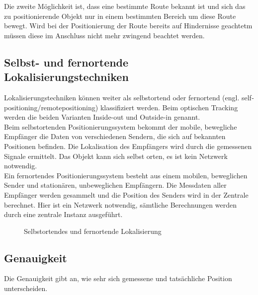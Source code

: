    Die zweite Möglichkeit ist, dass eine bestimmte Route bekannt ist und sich das zu positionierende Objekt nur in einem bestimmten Bereich um diese Route bewegt.
    Wird bei der Positionierung der Route bereits auf Hindernisse geachtetm müssen diese im Anschluss nicht mehr zwingend beachtet werden.

    \subsection*{Selbst- und fernortende Lokalisierungstechniken}
    Lokalisierungstechniken können weiter als selbstortend oder fernortend (engl. self­positioning/remote­positioning) klassifiziert werden. Beim optischen Tracking werden die beiden Varianten Inside-out und Outside-in genannt.\\
    Beim selbstortenden Positionierungssystem bekommt der mobile, bewegliche Empfänger die Daten von verschiedenen Sendern, die sich auf bekannten Positionen befinden. Die Lokalisation des Empfängers wird durch die gemessenen Signale ermittelt. Das Objekt kann sich selbst orten, es ist kein Netzwerk notwendig.\\
    Ein fernortendes Positionierungssystem besteht aus einem mobilen, beweglichen Sender und stationären, unbeweglichen Empfängern. Die Messdaten aller Empfänger werden gesammelt und die Position des Senders wird in der Zentrale berechnet. Hier ist ein Netzwerk notwendig, sämtliche Berechnungen werden durch eine zentrale Instanz ausgeführt.

    \begin{figure}[H]
      \begin{centering}
      \par\end{centering}
      \caption{Selbstortendes und fernortende Lokalisierung}
      \label{SelbstundFernortend}
    \end{figure}


    \subsection*{Genauigkeit}
    Die Genauigkeit gibt an, wie sehr sich gemessene und tatsächliche Position unterscheiden.

